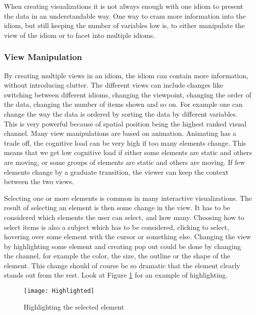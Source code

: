 \documentclass[Report.tex]{subfiles}
\begin{document}
When creating visualizations it is not always enough with one idiom to present the data in an understandable way. One way to cram more information into the idiom, but still keeping the number of variables low is, to either manipulate the view of the idiom or to facet into multiple idioms. 
\subsubsection{View Manipulation}
By creating multiple views in an idiom, the idiom can contain more information, without introducing clutter. The different views can include changes like switching between different idioms, changing the viewpoint, changing the order of the data, changing the number of items shown and so on. For example one can change the way the data is ordered by sorting the data by different variables. This is very powerful because of spatial position being the highest ranked visual channel. Many view manipulations are based on animation. Animating has a trade off, the cognitive load can be very high if too many elements change. This means that we get low cognitive load if either some elements are static and others are moving, or some groups of elements are static and others are moving. If few elements change by a graduate transition, the viewer can keep the context between the two views. \cite[Chapter 11]{Tamara}

Selecting one or more elements is common in many interactive visualizations. The result of selecting an element is then some change in the view. It has to be considered which elements the user can select, and how many. Choosing how to select items is also a subject which has to be considered, clicking to select, hovering over some element with the cursor or something else. 
Changing the view by highlighting some element and creating pop out could be done by changing the channel, for example the color, the size, the outline or the shape of the element. This change should of course be so dramatic that the element clearly stands out from the rest. Look at Figure \ref{fig:highlighted} for an example of highlighting. \cite[Chapter 11]{Tamara}
\begin{figure}
\center
\texttt{[image: Highlighted]}
\caption{Highlighting the selected element}
\label{fig:highlighted}
\end{figure}
\end{document}

